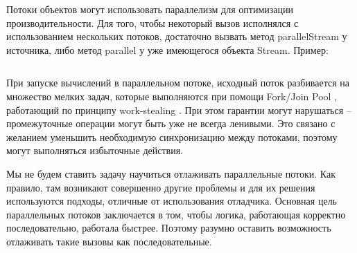 Потоки объектов могут использовать параллелизм для оптимизации производительности. Для того, чтобы некоторый вызов исполнялся с использованием нескольких потоков, достаточно вызвать метод parallelStream у источника, либо метод parallel у уже имеющегося объекта Stream. Пример: 
\inputminted{java}{chapter2/code/ParallelStream.java}
При запуске вычислений в параллельном потоке, исходный поток разбивается на множество мелких задач, которые выполняются при помощи Fork/Join Pool \cite{java:forkjoin}, работающий по принципу work-stealing \cite{wiki:worksteal}. При этом гарантии могут нарушаться -- промежуточные операции могут быть уже не всегда ленивыми. Это связано с желанием уменьшить необходимую синхронизацию между потоками, поэтому могут выполняться избыточные действия.

Мы не будем ставить задачу научиться отлаживать параллельные потоки. Как правило, там возникают совершенно другие проблемы и для их решения используются подходы, отличные от использования отладчика. Основная цель параллельных потоков заключается в том, чтобы логика, работающая корректно последовательно, работала быстрее. Поэтому разумно оставить возможность отлаживать такие вызовы как последовательные.